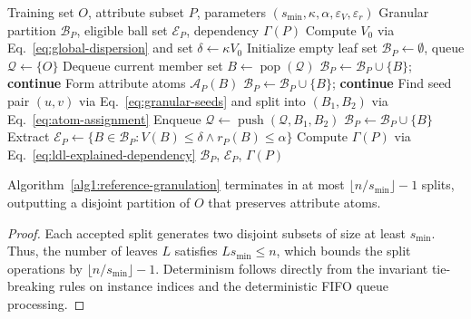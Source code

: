 \begin{algorithm}[t]
	\caption{Deterministic Granular-Ball Partitioning for Subset $P$}
	\label{alg1:reference-granulation}
	\begin{algorithmic}[1]
		\Require Training set $O$, attribute subset $P$, parameters $(s_{\min}, \kappa, \alpha, \varepsilon_V, \varepsilon_r)$
		\Ensure Granular partition $\mathcal{B}_P$, eligible ball set $\mathcal{E}_P$, dependency $\Gamma(P)$
		\State Compute $V_0$ via Eq.~\eqref{eq:global-dispersion} and set $\delta \gets \kappa V_0$
		\State Initialize empty leaf set $\mathcal{B}_P \gets \emptyset$, queue $\mathcal{Q} \gets \{O\}$
		\State Dequeue current member set $B \gets \operatorname{pop}(\mathcal{Q})$
		\State $\mathcal{B}_P \gets \mathcal{B}_P \cup \{B\}$; \textbf{continue}
		\EndIf
		\State Form attribute atoms $\mathcal{A}_P(B)$
		\State $\mathcal{B}_P \gets \mathcal{B}_P \cup \{B\}$; \textbf{continue}
		\EndIf
		\State Find seed pair $(u, v)$ via Eq.~\eqref{eq:granular-seeds} and split into $(B_1, B_2)$ via Eq.~\eqref{eq:atom-assignment}
		\State Enqueue $\mathcal{Q} \gets \operatorname{push}(\mathcal{Q}, B_1, B_2)$
		\Else
		\State $\mathcal{B}_P \gets \mathcal{B}_P \cup \{B\}$
		\EndIf
		\EndWhile
		\State Extract $\mathcal{E}_P \gets \{B \in \mathcal{B}_P : V(B) \le \delta \land r_P(B) \le \alpha\}$
		\State Compute $\Gamma(P)$ via Eq.~\eqref{eq:ldl-explained-dependency}
		\State \Return $\mathcal{B}_P$, $\mathcal{E}_P$, $\Gamma(P)$
	\end{algorithmic}
\end{algorithm}

\begin{proposition}
	Algorithm~\ref{alg1:reference-granulation} terminates in at most $\lfloor n/s_{\min} \rfloor - 1$ splits, outputting a disjoint partition of $O$ that preserves attribute atoms.
\end{proposition}
\begin{proof}
	Each accepted split generates two disjoint subsets of size at least $s_{\min}$. Thus, the number of leaves $L$ satisfies $L s_{\min} \le n$, which bounds the split operations by $\lfloor n/s_{\min} \rfloor - 1$. Determinism follows directly from the invariant tie-breaking rules on instance indices and the deterministic FIFO queue processing.
\end{proof}

